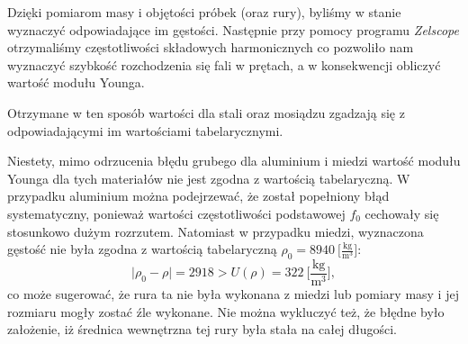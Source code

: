 \documentclass[12pt,a4paper]{article}
\numberwithin{equation}{section}
\begin{document}
Dzięki pomiarom masy i objętości próbek (oraz rury), byliśmy w stanie wyznaczyć odpowiadające im gęstości. Następnie przy pomocy programu \emph{Zelscope} otrzymaliśmy częstotliwości składowych harmonicznych co pozwoliło nam wyznaczyć szybkość rozchodzenia się fali w prętach, a w konsekwencji obliczyć wartość modułu Younga.

Otrzymane w ten sposób wartości dla stali oraz mosiądzu zgadzają się z odpowiadającymi im wartościami tabelarycznymi.

Niestety, mimo odrzucenia błędu grubego dla aluminium i miedzi wartość modułu Younga dla tych materiałów nie jest zgodna z wartością tabelaryczną. W przypadku aluminium można podejrzewać, że został popełniony błąd systematyczny, ponieważ wartości częstotliwości podstawowej $f_0$ cechowały się stosunkowo dużym rozrzutem. Natomiast w przypadku miedzi, wyznaczona gęstość nie była zgodna z wartością tabelaryczną $\rho_0 = 8940~\Big[\frac{\textrm{kg}}{\textrm{m}^3}\Big]$:
\begin{equation}
\Big|\rho_0 - \rho\Big| = 2918 > U(\rho) = 322~\Big[\frac{\textrm{kg}}{\textrm{m}^3}\Big],
\end{equation}
co może sugerować, że rura ta nie była wykonana z miedzi lub pomiary masy i jej rozmiaru mogły zostać źle wykonane. Nie można wykluczyć też, że błędne było założenie, iż średnica wewnętrzna tej rury była stała na całej długości.
\end{document}
